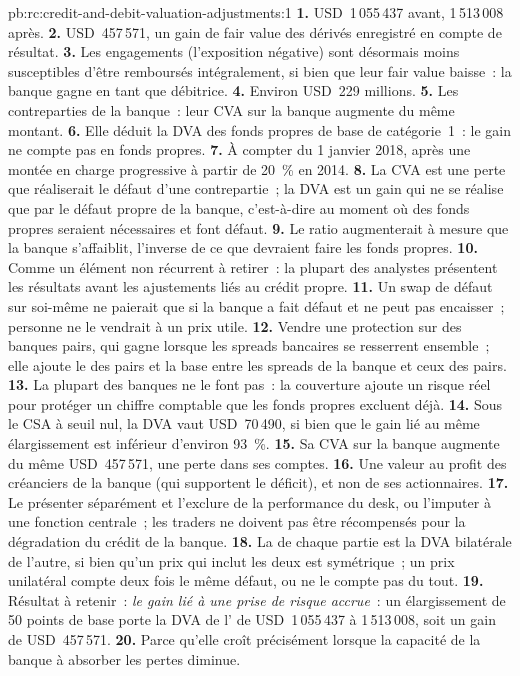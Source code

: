 \begin{solution}{pb:rc:credit-and-debit-valuation-adjustments:1}
\textbf{1.} USD~1\,055\,437 avant, 1\,513\,008 après.
\textbf{2.} USD~457\,571, un gain de fair value des dérivés enregistré en compte de résultat.
\textbf{3.} Les engagements (l'exposition négative) sont désormais moins susceptibles d'être remboursés intégralement, si bien que
leur fair value baisse~: la banque gagne en tant que débitrice.
\textbf{4.} Environ USD~229 millions.
\textbf{5.} Les contreparties de la banque~: leur CVA sur la banque augmente du même montant.
\textbf{6.} Elle déduit la DVA des fonds propres de base de catégorie~1~: le gain ne compte pas en fonds propres.
\textbf{7.} À compter du 1 janvier 2018, après une montée en charge progressive à partir de 20~\% en 2014.
\textbf{8.} La CVA est une perte que réaliserait le défaut d'une contrepartie~; la DVA est un gain qui ne se réalise que
par le défaut propre de la banque, c'est-à-dire au moment où des fonds propres seraient nécessaires et font défaut.
\textbf{9.} Le ratio augmenterait à mesure que la banque s'affaiblit, l'inverse de ce que devraient faire les fonds propres.
\textbf{10.} Comme un élément non récurrent à retirer~: la plupart des analystes présentent les résultats avant les
ajustements liés au crédit propre.
\textbf{11.} Un swap de défaut sur soi-même ne paierait que si la banque a fait défaut et ne peut
pas encaisser~; personne ne le vendrait à un prix utile.
\textbf{12.} Vendre une protection sur des banques pairs, qui gagne lorsque les spreads bancaires se resserrent ensemble~;
elle ajoute le  des pairs et la base entre les spreads de la banque et ceux des pairs.
\textbf{13.} La plupart des banques ne le font pas~: la couverture ajoute un risque réel pour protéger un chiffre comptable que
les fonds propres excluent déjà.
\textbf{14.} Sous le CSA à seuil nul, la DVA vaut USD~70\,490, si bien que le gain lié au même
élargissement est inférieur d'environ 93~\%.
\textbf{15.} Sa CVA sur la banque augmente du même USD~457\,571, une perte dans ses comptes.
\textbf{16.} Une valeur au profit des créanciers de la banque (qui supportent le déficit), et non de ses actionnaires.
\textbf{17.} Le présenter séparément et l'exclure de la performance du desk, ou l'imputer à une
fonction centrale~; les traders ne doivent pas être récompensés pour la dégradation du crédit de la banque.
\textbf{18.} La  de chaque partie est la DVA bilatérale de l'autre, si bien qu'un prix qui inclut
les deux est symétrique~; un prix unilatéral compte deux fois le même défaut, ou ne le compte pas du tout.
\textbf{19.} Résultat à retenir~: \emph{le gain lié à une prise de risque accrue}~: un élargissement de 50 points de base porte la
DVA de l' de USD~1\,055\,437 à 1\,513\,008, soit un gain de USD~457\,571.
\textbf{20.} Parce qu'elle croît précisément lorsque la capacité de la banque à absorber les pertes diminue.
\end{solution}

